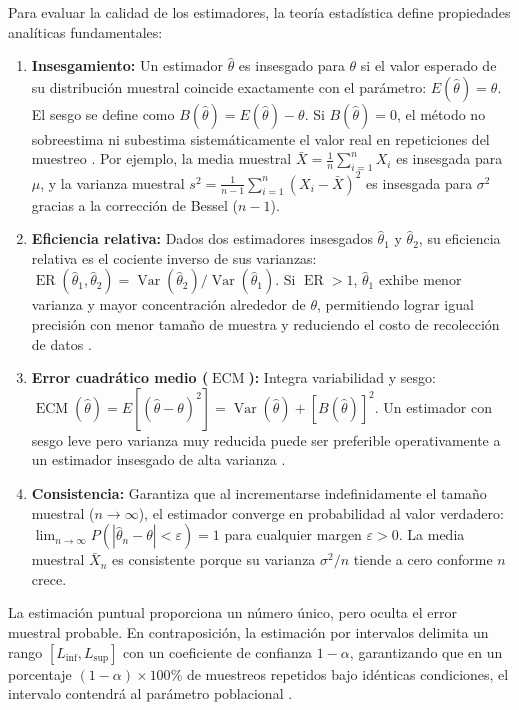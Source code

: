 {Para evaluar la calidad de los estimadores, la teoría estadística define propiedades analíticas fundamentales:
\begin{enumerate}
  \item \textbf{Insesgamiento:} Un estimador $\hat{\theta}$ es insesgado para $\theta$ si el valor esperado de su distribución muestral coincide exactamente con el parámetro: $E(\hat{\theta}) = \theta$. El sesgo se define como $B(\hat{\theta}) = E(\hat{\theta}) - \theta$. Si $B(\hat{\theta}) = 0$, el método no sobreestima ni subestima sistemáticamente el valor real en repeticiones del muestreo \citep{wackerly2010}. Por ejemplo, la media muestral $\bar{X} = \frac{1}{n}\sum_{i=1}^n X_i$ es insesgada para $\mu$, y la varianza muestral $s^2 = \frac{1}{n-1}\sum_{i=1}^n (X_i - \bar{X})^2$ es insesgada para $\sigma^2$ gracias a la corrección de Bessel ($n-1$).
  \item \textbf{Eficiencia relativa:} Dados dos estimadores insesgados $\hat{\theta}_1$ y $\hat{\theta}_2$, su eficiencia relativa es el cociente inverso de sus varianzas: $\operatorname{ER}(\hat{\theta}_1, \hat{\theta}_2) = \operatorname{Var}(\hat{\theta}_2)/\operatorname{Var}(\hat{\theta}_1)$. Si $\operatorname{ER} > 1$, $\hat{\theta}_1$ exhibe menor varianza y mayor concentración alrededor de $\theta$, permitiendo lograr igual precisión con menor tamaño de muestra y reduciendo el costo de recolección de datos \citep{anderson2012}.
  \item \textbf{Error cuadrático medio ($\operatorname{ECM}$):} Integra variabilidad y sesgo: $\operatorname{ECM}(\hat{\theta}) = E[(\hat{\theta} - \theta)^2] = \operatorname{Var}(\hat{\theta}) + [B(\hat{\theta})]^2$. Un estimador con sesgo leve pero varianza muy reducida puede ser preferible operativamente a un estimador insesgado de alta varianza \citep{wackerly2010}.
  \item \textbf{Consistencia:} Garantiza que al incrementarse indefinidamente el tamaño muestral ($n \to \infty$), el estimador converge en probabilidad al valor verdadero: $\lim_{n \to \infty} P(|\hat{\theta}_n - \theta| < \varepsilon) = 1$ para cualquier margen $\varepsilon > 0$. La media muestral $\bar{X}_n$ es consistente porque su varianza $\sigma^2/n$ tiende a cero conforme $n$ crece.
\end{enumerate}

La estimación puntual proporciona un número único, pero oculta el error muestral probable. En contraposición, la estimación por intervalos delimita un rango $[L_{\text{inf}}, L_{\text{sup}}]$ con un coeficiente de confianza $1-\alpha$, garantizando que en un porcentaje $(1-\alpha)\times 100\%$ de muestreos repetidos bajo idénticas condiciones, el intervalo contendrá al parámetro poblacional \citep{holmesBusiness2023,nistHandbook}.

}
